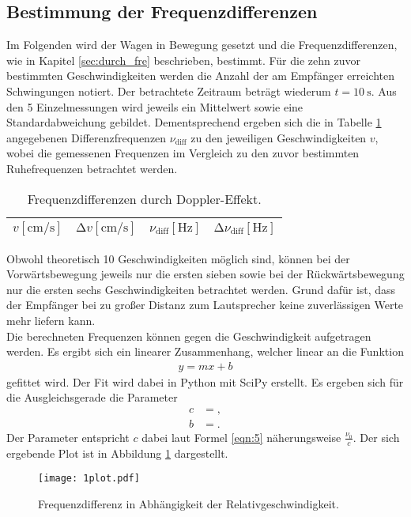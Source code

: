 \subsection{Bestimmung der Frequenzdifferenzen}
\label{sec:aa1}
Im Folgenden wird der Wagen in Bewegung gesetzt und die Frequenzdifferenzen, wie in Kapitel \ref{sec:durch_fre} beschrieben, bestimmt.
Für die zehn zuvor bestimmten Geschwindigkeiten werden die Anzahl der am Empfänger erreichten Schwingungen notiert.
Der betrachtete Zeitraum beträgt wiederum $t = \SI{10}{\second}$.
Aus den 5 Einzelmessungen wird jeweils ein Mittelwert sowie eine Standardabweichung gebildet.
Dementsprechend ergeben sich die in Tabelle \ref{tab:diffe} angegebenen Differenzfrequenzen $\nu_{\text{diff}}$ zu den jeweiligen Geschwindigkeiten $v$, wobei die gemessenen Frequenzen im Vergleich zu den zuvor bestimmten Ruhefrequenzen betrachtet werden.
\begin{table}
  \centering
  \caption{Frequenzdifferenzen durch Doppler-Effekt.}
  \label{tab:diffe}
  \begin{tabular}{c c c c}
    \toprule
    {$v [\si{\centi\metre\per\second}]$} & {$\increment{v} [\si{\centi\metre\per\second}]$} & {$\nu_{\text{diff}} [\si{\hertz}]$} & {$\increment{\nu_{\text{diff}}} [\si{\hertz}]$}\\
    \midrule
    
    \bottomrule
  \end{tabular}
\end{table}
Obwohl theoretisch 10 Geschwindigkeiten möglich sind, können bei der Vorwärtsbewegung jeweils nur die ersten sieben sowie bei der Rückwärtsbewegung nur die ersten sechs Geschwindigkeiten betrachtet werden.
Grund dafür ist, dass der Empfänger bei zu großer Distanz zum Lautsprecher keine zuverlässigen Werte mehr liefern kann.\\

Die berechneten Frequenzen können gegen die Geschwindigkeit aufgetragen werden.
Es ergibt sich ein linearer Zusammenhang, welcher linear an die Funktion
\begin{align*}
  y = m x + b
\end{align*}
gefittet wird.
Der Fit wird dabei in Python mit SciPy erstellt.
Es ergeben sich für die Ausgleichsgerade die Parameter
\begin{align*}
  c &= , \\
  b &= .
\end{align*}
Der Parameter entspricht $c$ dabei laut Formel \ref{eqn:5} näherungsweise $\frac{ \nu_0}{c}$.
Der sich ergebende Plot ist in Abbildung \ref{afig:1} dargestellt.
\begin{figure}
  \centering
  \texttt{[image: 1plot.pdf]}
  \caption{Frequenzdifferenz in Abhängigkeit der Relativgeschwindigkeit.}
  \label{afig:1}
\end{figure}

